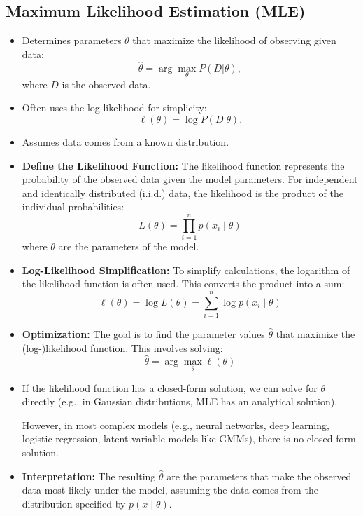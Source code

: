 \documentclass[12pt,a4paper]{article}
\begin{document}
\subsection{Maximum Likelihood Estimation (MLE)}
\begin{itemize}
    \item Determines parameters $\theta$ that maximize the likelihood of observing given data:
    \[ \hat{\theta} = \arg\max_{\theta} P(D | \theta), \]
    where $D$ is the observed data.
    \item Often uses the log-likelihood for simplicity:
    \[ \ell(\theta) = \log P(D | \theta). \]
    \item Assumes data comes from a known distribution.
\end{itemize}
\begin{itemize}
    \item \textbf{Define the Likelihood Function:} The likelihood function represents the probability of the observed data given the model parameters. For independent and identically distributed (i.i.d.) data, the likelihood is the product of the individual probabilities: 
    \[
    L(\theta) = \prod_{i=1}^n p(x_i \mid \theta)
    \]
    where \( \theta \) are the parameters of the model.

    \item \textbf{Log-Likelihood Simplification:} To simplify calculations, the logarithm of the likelihood function is often used. This converts the product into a sum:
    \[
    \ell(\theta) = \log L(\theta) = \sum_{i=1}^n \log p(x_i \mid \theta)
    \]

    \item \textbf{Optimization:} The goal is to find the parameter values \( \hat{\theta} \) that maximize the (log-)likelihood function. This involves solving:
    \[
    \hat{\theta} = \arg \max_\theta \ell(\theta)
    \]
    \item If the likelihood function has a closed-form solution, we can solve for 
$\theta$ directly (e.g., in Gaussian distributions, MLE has an analytical solution).

However, in most complex models (e.g., neural networks, deep learning, logistic regression, latent variable models like GMMs), there is no closed-form solution.
    \item \textbf{Interpretation:} The resulting \( \hat{\theta} \) are the parameters that make the observed data most likely under the model, assuming the data comes from the distribution specified by \( p(x \mid \theta) \).
\end{itemize}
\end{document}
